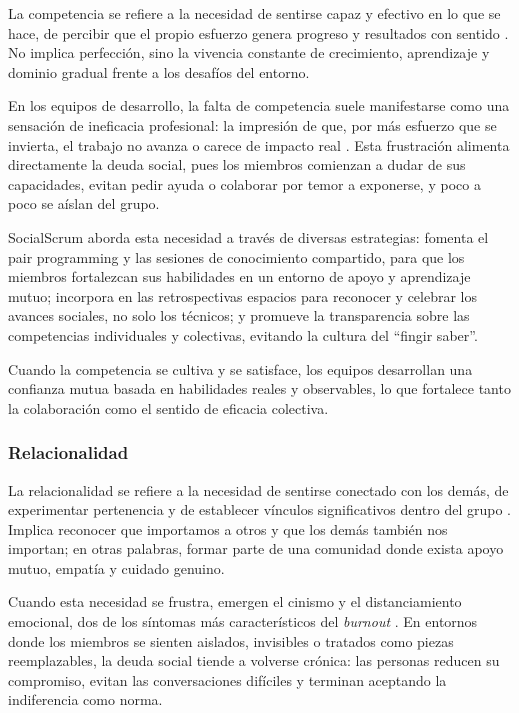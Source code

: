 La competencia se refiere a la necesidad de sentirse capaz y efectivo en lo que se hace, de percibir que el propio esfuerzo genera progreso y resultados con sentido \cite{ryan_self-determination_2000}.
No implica perfección, sino la vivencia constante de crecimiento, aprendizaje y dominio gradual frente a los desafíos del entorno.

En los equipos de desarrollo, la falta de competencia suele manifestarse como una sensación de ineficacia profesional: la impresión de que, por más esfuerzo que se invierta, el trabajo no avanza o carece de impacto real \cite{tulili2022burnout}.
Esta frustración alimenta directamente la deuda social, pues los miembros comienzan a dudar de sus capacidades, evitan pedir ayuda o colaborar por temor a exponerse, y poco a poco se aíslan del grupo.

SocialScrum aborda esta necesidad a través de diversas estrategias: fomenta el pair programming y las sesiones de conocimiento compartido, para que los miembros fortalezcan sus habilidades en un entorno de apoyo y aprendizaje mutuo; incorpora en las retrospectivas espacios para reconocer y celebrar los avances sociales, no solo los técnicos; y promueve la transparencia sobre las competencias individuales y colectivas, evitando la cultura del ``fingir saber''.

Cuando la competencia se cultiva y se satisface, los equipos desarrollan una confianza mutua basada en habilidades reales y observables, lo que fortalece tanto la colaboración como el sentido de eficacia colectiva.

\subsubsection{Relacionalidad}

La relacionalidad se refiere a la necesidad de sentirse conectado con los demás, de experimentar pertenencia y de establecer vínculos significativos dentro del grupo \cite{ryan_self-determination_2000}.
Implica reconocer que importamos a otros y que los demás también nos importan; en otras palabras, formar parte de una comunidad donde exista apoyo mutuo, empatía y cuidado genuino.

Cuando esta necesidad se frustra, emergen el cinismo y el distanciamiento emocional, dos de los síntomas más característicos del \textit{burnout} \cite{tulili2022burnout}.
En entornos donde los miembros se sienten aislados, invisibles o tratados como piezas reemplazables, la deuda social tiende a volverse crónica: las personas reducen su compromiso, evitan las conversaciones difíciles y terminan aceptando la indiferencia como norma.

